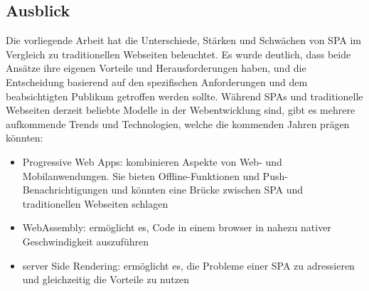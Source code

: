 \subsection{Ausblick}
Die vorliegende Arbeit hat die Unterschiede, Stärken und Schwächen von \ac{SPA} im Vergleich zu traditionellen Webseiten beleuchtet.
Es wurde deutlich, dass beide Ansätze ihre eigenen Vorteile und Herausforderungen haben, und die Entscheidung basierend auf den spezifischen Anforderungen und dem beabsichtigten Publikum getroffen werden sollte.
Während SPAs und traditionelle Webseiten derzeit beliebte Modelle in der Webentwicklung sind, gibt es mehrere aufkommende Trends und Technologien, welche die kommenden Jahren prägen könnten:

\begin{itemize}
    \item Progressive Web Apps: kombinieren Aspekte von Web- und Mobilanwendungen. Sie bieten Offline-Funktionen und Push-Benachrichtigungen und könnten eine Brücke zwischen \ac{SPA} und traditionellen Webseiten schlagen
    \item WebAssembly: ermöglicht es, Code in einem \gls{browser} in nahezu nativer Geschwindigkeit auszuführen
    \item \gls{server} Side Rendering: ermöglicht es, die Probleme einer \ac{SPA} zu adressieren und gleichzeitig die Vorteile zu nutzen
\end{itemize}

